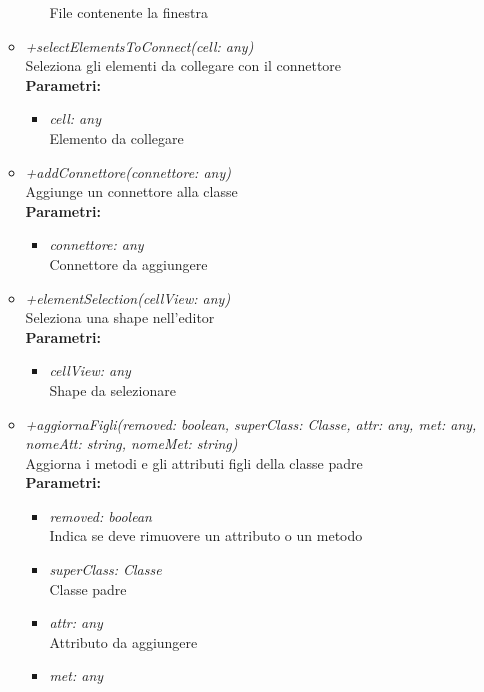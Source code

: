 \begin{itemize}
\begin{itemize}
\begin{itemize}
    			File contenente la finestra
    		\end{itemize}
    		\item \emph{+selectElementsToConnect(cell: any)}\\
    		Seleziona gli elementi da collegare con il connettore\\
    		\textbf{Parametri:}
    		\begin{itemize}
    			\item \emph{cell: any}\\
    			Elemento da collegare
    		\end{itemize}
    		\item \emph{+addConnettore(connettore: any)}\\
    		Aggiunge un connettore alla classe\\
    		\textbf{Parametri:}
    		\begin{itemize}
    			\item \emph{connettore: any}\\
    			Connettore da aggiungere
    		\end{itemize}
    		\item \emph{+elementSelection(cellView: any)}\\
    		Seleziona una shape nell'editor\\
    		\textbf{Parametri:}
    		\begin{itemize}
    			\item \emph{cellView: any}\\
    			Shape da selezionare
    		\end{itemize}
    		\item \emph{+aggiornaFigli(removed: boolean, superClass: Classe, attr: any, met: any, nomeAtt: string, nomeMet: string)}\\
    		Aggiorna i metodi e gli attributi figli della classe padre\\
    		\textbf{Parametri:}
    		\begin{itemize}
    			\item \emph{removed: boolean}\\
    			Indica se deve rimuovere un attributo o un metodo
    			\item \emph{superClass: Classe}\\
    			Classe padre
    			\item \emph{attr: any}\\
    			Attributo da aggiungere
    			\item \emph{met: any}\\

\end{itemize}
\end{itemize}
\end{itemize}
